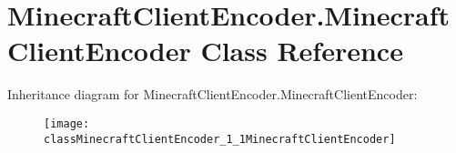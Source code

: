 \hypertarget{classMinecraftClientEncoder_1_1MinecraftClientEncoder}{\section{Minecraft\-Client\-Encoder.\-Minecraft\-Client\-Encoder Class Reference}
\label{classMinecraftClientEncoder_1_1MinecraftClientEncoder}
}
Inheritance diagram for Minecraft\-Client\-Encoder.\-Minecraft\-Client\-Encoder\-:\begin{figure}[H]
\begin{center}
\leavevmode
\texttt{[image: classMinecraftClientEncoder\_1\_1MinecraftClientEncoder]}
\end{center}
\end{figure}
